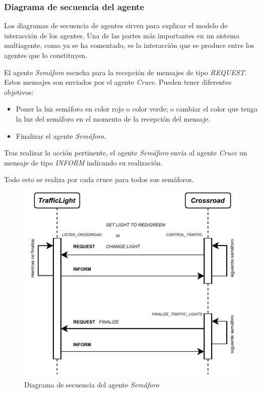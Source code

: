 \newpage
\subsubsection{Diagrama de secuencia del agente}
Los diagramas de secuencia de agentes sirven para explicar el modelo de interacción de los agentes. Una de las partes más importantes en un sistema multiagente, como ya se ha comentado, es la interacción que se produce entre los agentes que lo constituyen. 

El agente \textit{Semáforo} escucha para la recepción de mensajes de tipo \textit{REQUEST}. Estos mensajes son enviados por el agente \textit{Cruce}. Pueden tener diferentes objetivos:
\begin{itemize}
    \item Poner la luz semáforo en color rojo o color verde; o cambiar el color que tenga la luz del semáforo en el momento de la recepción del mensaje.
    \item Finalizar el agente \textit{Semáforo}.
\end{itemize}
Tras realizar la acción pertinente, el agente \textit{Semáforo} envía al agente \textit{Cruce} un mensaje de tipo \textit{INFORM} indicando su realización.

Todo esto se realiza por cada cruce para todos sus semáforos.
\begin{figure}[H]
    \centering
    \includegraphics[width=1\linewidth]{text/image/DAgen-DS-TrafficLight.pdf}
    \caption{Diagrama de secuencia del agente \textit{Semáforo}}
    \label{fig:ds_agente_semaforo}
\end{figure}

